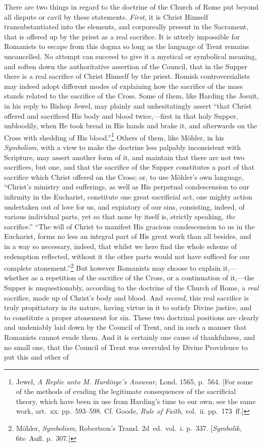 \documentclass[
]{book}
\begin{document}
There are two things in regard to the doctrine of the Church of Rome put beyond all dispute or cavil by these statements. \emph{First}, it is Christ Himself transubstantiated into the elements, and corporeally present in the Sacrament, that is offered up by the priest as a real sacrifice. It is utterly impossible for Romanists to escape from this dogma so long as the language of Trent remains uncancelled. No attempt can succeed to give it a mystical or symbolical meaning, and soften down the authoritative assertion of the Council, that in the Supper there is a real sacrifice of Christ Himself by the priest. Romish controversialists may indeed adopt different modes of explaining how the sacrifice of the mass stands related to the sacrifice of the Cross. Some of them, like Harding the Jesuit, in his reply to Bishop Jewel, may plainly and unhesitatingly assert ``that Christ offered and sacrificed His body and blood twice,---first in that holy Supper, unbloodily, when He took bread in His hands and brake it, and afterwards on the Cross with shedding of His blood.''\footnote{Jewel, \emph{A Replie unto M. Hardinge's Answear}, Lond. 1565, p.~564. {[}For some of the methods of evading the legitimate consequences of the sacrificial theory, which have been in use from Harding's time to our own, see the same work, art.~xx. pp.~593--598. Cf. Goode, \emph{Rule of Faith}, vol.~ii. pp.~173~ff.{]}} Others of them, like Möhler, in his \emph{Symbolism}, with a view to make the doctrine less palpably inconsistent with Scripture, may assert another form of it, and maintain that there are not two sacrifices, but one, and that the sacrifice of the Supper constitutes a part of that sacrifice which Christ offered on the Cross; or, to use Möhler's own language, ``Christ's ministry and sufferings, as well as His perpetual condescension to our infirmity in the Eucharist, constitute one great sacrificial act, one mighty action undertaken out of love for us, and expiatory of our sins, consisting, indeed, of various individual parts, yet so that none by itself is, strictly speaking, \emph{the} sacrifice.'' ``The will of Christ to manifest His gracious condescension to us in the Eucharist, forms no less an integral part of His great work than all besides, and in a way so necessary, indeed, that whilst we here find the whole scheme of redemption reflected, without it the other parts would not have sufficed for our complete atonement.''\footnote{Möhler, \emph{Symbolism}, Robertson's Transl. 2d~ed.~vol.~i. p.~337. {[}\foreignlanguage{ngerman}{\emph{Symbolik}}, 6te~Aufl. p.~307.{]}} But however Romanists may choose to explain it,---whether as a repetition of the sacrifice of the Cross, or a continuation of it,---the Supper is unquestionably, according to the doctrine of the Church of Rome, a \emph{real} sacrifice, made up of Christ's body and blood. And \emph{second}, this real sacrifice is truly propitiatory in its nature, having virtue in it to satisfy Divine justice, and to constitute a proper atonement for sin. These two doctrinal positions are clearly and undeniably laid down by the Council of Trent, and in such a manner that Romanists cannot evade them. And it is certainly one cause of thankfulness, and no small one, that the Council of Trent was overruled by Divine Providence to put this and other of 
\end{document}
